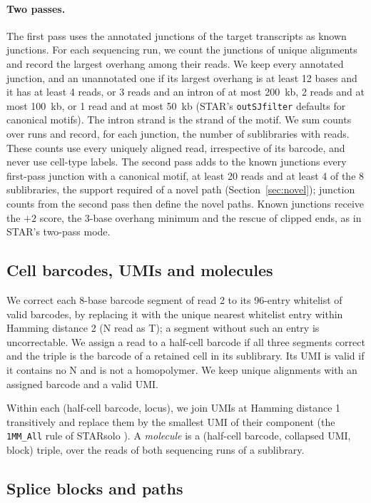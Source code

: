 \documentclass[11pt]{article}
\begin{document}
\paragraph{Two passes.} The first pass uses the annotated junctions of the target transcripts as known junctions. For each sequencing run, we count the junctions of unique alignments and record the largest overhang among their reads. We keep every annotated junction, and an unannotated one if its largest overhang is at least 12 bases and it has at least 4 reads, or 3 reads and an intron of at most 200~kb, 2 reads and at most 100~kb, or 1 read and at most 50~kb (STAR's \texttt{outSJfilter} defaults for canonical motifs). The intron strand is the strand of the motif. We sum counts over runs and record, for each junction, the number of sublibraries with reads. These counts use every uniquely aligned read, irrespective of its barcode, and never use cell-type labels. The second pass adds to the known junctions every first-pass junction with a canonical motif, at least 20 reads and at least 4 of the 8 sublibraries, the support required of a novel path (Section~\ref{sec:novel}); junction counts from the second pass then define the novel paths. Known junctions receive the $+2$ score, the 3-base overhang minimum and the rescue of clipped ends, as in STAR's two-pass mode.

\subsection{Cell barcodes, UMIs and molecules}

We correct each 8-base barcode segment of read 2 to its 96-entry whitelist of valid barcodes, by replacing it with the unique nearest whitelist entry within Hamming distance 2 (N read as T); a segment without such an entry is uncorrectable. We assign a read to a half-cell barcode if all three segments correct and the triple is the barcode of a retained cell in its sublibrary. Its UMI is valid if it contains no N and is not a homopolymer. We keep unique alignments with an assigned barcode and a valid UMI.

Within each (half-cell barcode, locus), we join UMIs at Hamming distance 1 transitively and replace them by the smallest UMI of their component (the \texttt{1MM\_All} rule of STARsolo \cite{kaminow2021}). A \emph{molecule} is a (half-cell barcode, collapsed UMI, block) triple, over the reads of both sequencing runs of a sublibrary.

\subsection{Splice blocks and paths}
\end{document}
